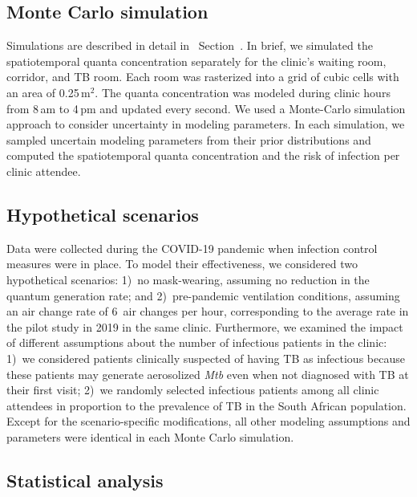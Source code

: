 \documentclass[fleqn,11pt]{wlscirep}
\begin{document}
\subsection*{Monte Carlo simulation}

Simulations are described in detail in \supp~Section~. In brief, we simulated the spatiotemporal quanta concentration separately for the clinic's waiting room, corridor, and TB room. Each room was rasterized into a grid of cubic cells with an area of 0.25\,m$^2$. The quanta concentration was modeled during clinic hours from 8\,am to 4\,pm and updated every second. We used a Monte-Carlo simulation approach to consider uncertainty in modeling parameters. In each simulation, we sampled uncertain modeling parameters from their prior distributions and computed the spatiotemporal quanta concentration and the risk of infection per clinic attendee. 

\subsection*{Hypothetical scenarios}

Data were collected during the COVID-19 pandemic when infection control measures were in place. To model their effectiveness, we considered two hypothetical scenarios: 1)~no mask-wearing, \ie assuming no reduction in the quantum generation rate; and 2)~pre-pandemic ventilation conditions, \ie assuming an air change rate of 6~air changes per hour, corresponding to the average rate in the pilot study in 2019 in the same clinic\cite{Zurcher2022JID}. Furthermore, we examined the impact of different assumptions about the number of infectious patients in the clinic: 1)~we considered patients clinically suspected of having TB as infectious because these patients may generate aerosolized \emph{Mtb} even when not diagnosed with TB at their first visit\cite{Patterson2024PNAS}; 2)~we randomly selected infectious patients among all clinic attendees in proportion to the prevalence of TB in the South African population\cite{Moyo2022LancetID}. Except for the scenario-specific modifications, all other modeling assumptions and parameters were identical in each Monte Carlo simulation. 

\subsection*{Statistical analysis}
\end{document}
